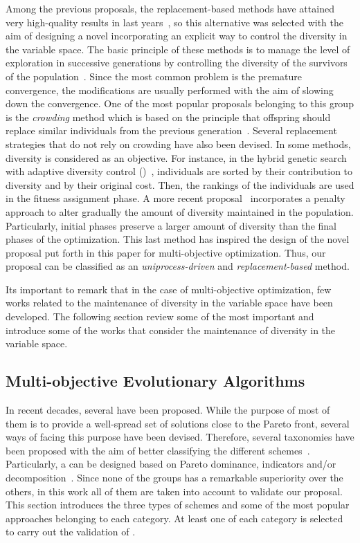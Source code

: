 Among the previous proposals, the replacement-based methods have attained very high-quality results in last years~\cite{Segura:17}, so
this alternative was selected with the aim of designing a novel \MOEA{} incorporating an explicit way to control the diversity 
in the variable space.
%
The basic principle of these methods is to manage the level of exploration in successive generations by 
controlling the diversity of the survivors of the population~\cite{Segura:17}.
%
Since the most common problem is the premature convergence, the modifications are usually performed with the aim
of slowing down the convergence.
%
One of the most popular proposals belonging to this group is the \textit{crowding} method which
is based on the principle that offspring should replace similar individuals from the previous generation~\cite{Mengshoel:14}.
%
Several replacement strategies that do not rely on crowding have also been devised.
%
In some methods, diversity is considered as an objective.
%
For instance, in the hybrid genetic search with adaptive diversity control (\HGSADC{})~\cite{Vidal:13}, individuals are sorted 
by their contribution to diversity and by their original cost.
%
Then, the rankings of the individuals are used in the fitness assignment phase.
%
A more recent proposal~\cite{Segura:17} incorporates a penalty approach to alter gradually the amount of diversity 
maintained in the population.
%
Particularly, initial phases preserve a larger amount of diversity than the final phases of the optimization.
%
This last method has inspired the design of the novel proposal put forth in this paper for multi-objective optimization.
%
Thus, our proposal can be classified as an \textit{uniprocess-driven} and \textit{replacement-based} method.

Its important to remark that in the case of multi-objective optimization, few works related to the maintenance of 
diversity in the variable space have been developed.
%
The following section review some of the most important \MOEAS{} and introduce some of the works that consider
the maintenance of diversity in the variable space.

\subsection{Multi-objective Evolutionary Algorithms}

In recent decades, several \MOEAS{} have been proposed. 
%
While the purpose of most of them is to provide a well-spread set of solutions close to the Pareto front,
several ways of facing this purpose have been devised.
%
Therefore, several taxonomies have been proposed with the aim of better classifying the different 
schemes~\cite{Joel:BOOK_MOEAs}.
%
Particularly, a \MOEA{} can be designed based on Pareto dominance, indicators and/or decomposition~\cite{Joel:StateArt}.
%
Since none of the groups has a remarkable superiority over the others, in this work all of them are taken into account to validate
our proposal.
%
This section introduces the three types of schemes and some of the most popular approaches belonging to each category.
%
At least one \MOEA{} of each category is selected to carry out the validation of \VSDMOEA{}.

